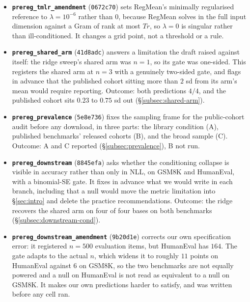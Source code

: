 \begin{itemize}
\item \textbf{\texttt{prereg\_tmlr\_amendment}} (\texttt{0672c70}) sets
RegMean's minimally regularised reference to $\lambda = 10^{-6}$ rather
than $0$, because RegMean solves in the full input dimension against a Gram
of rank at most $Tr$, so $\lambda = 0$ is singular rather than
ill-conditioned. It changes a grid point, not a threshold or a rule.

\item \textbf{\texttt{prereg\_shared\_arm}} (\texttt{41d8adc}) answers a
limitation the draft raised against itself: the ridge sweep's shared arm
was $n = 1$, so its gate was one-sided. This registers the shared arm at
$n = 3$ with a genuinely two-sided gate, and flags in advance that the
published cohort sitting more than $2$ sd from its arm's mean would
require reporting. Outcome: both predictions $4/4$, and the published
cohort sits $0.23$ to $0.75$ sd out (\S\ref{subsec:shared-arm}).

\item \textbf{\texttt{prereg\_prevalence}} (\texttt{5e8e736}) fixes the
sampling frame for the public-cohort audit before any download, in three
parts: the library condition (A), published benchmarks' released cohorts
(B), and the broad sample (C). Outcome: A and C reported
(\S\ref{subsec:prevalence}), B not run.

\item \textbf{\texttt{prereg\_downstream}} (\texttt{8845efa}) asks whether
the conditioning collapse is visible in accuracy rather than only in NLL,
on GSM8K and HumanEval, with a binomial-SE gate. It fixes in advance what
we would write in each branch, including that a null would move the metric
limitation into \S\ref{sec:intro} and delete the practice recommendations.
Outcome: the ridge recovers the shared arm on four of four bases on both
benchmarks (\S\ref{subsec:downstream-cond}).

\item \textbf{\texttt{prereg\_downstream\_amendment}} (\texttt{9b20d1e})
corrects our own specification error: it registered $n = 500$ evaluation
items, but HumanEval has $164$. The gate adapts to the actual $n$, which
widens it to roughly $11$ points on HumanEval against $6$ on GSM8K, so the
two benchmarks are not equally powered and a null on HumanEval is not read
as equivalent to a null on GSM8K. It makes our own predictions harder to
satisfy, and was written before any cell ran.


\end{itemize}

